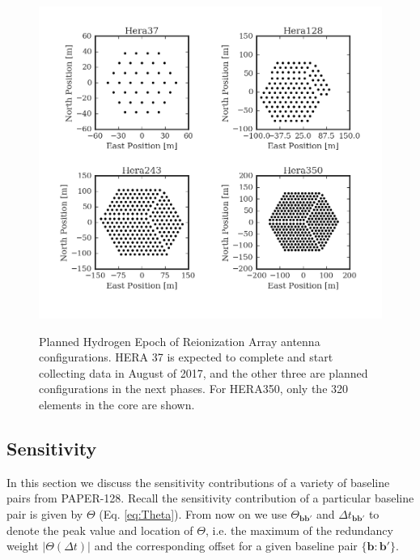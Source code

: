 \documentclass[twocolumn,apj,numberedappendix]{emulateapj}
\renewcommand\[{\begin{equation}}
\renewcommand\]{\end{equation}}
\begin{document}
\begin{figure}[h]
\includegraphics[width=\linewidth]{HeraAntpos}
\label{fig:HeraAntpos}
\caption{Planned Hydrogen Epoch of Reionization Array antenna configurations. HERA 37 is expected to complete and start collecting data in August of 2017, and the other three are planned configurations in the next phases. For HERA350, only the 320 elements in the core are shown. }
\end{figure}

\subsection{ Sensitivity \label{sec:sensitivity}}
In this section we discuss the sensitivity contributions of a variety of baseline pairs from PAPER-128.
Recall the sensitivity contribution of a particular baseline pair is given by $\Theta$ (Eq. \eqref{eq:Theta}). From now on we use $\Theta_{\boldsymbol{bb'}}$ and $\Delta t_{\boldsymbol{bb'}}$ to denote the peak value and location of $\Theta$, i.e. the maximum of the redundancy weight $|\Theta(\Delta t)|$ and the corresponding offset for a given baseline pair $\{\boldsymbol{b}:\boldsymbol{b'}\}$. 
\end{document}
